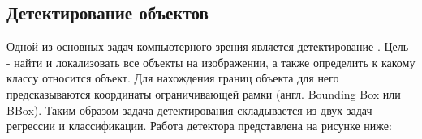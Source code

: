 \subsection{Детектирование объектов}

Одной из основных задач компьютерного зрения является детектирование \cite{lib-detection-task}. Цель - найти и локализовать все объекты на изображении, а также определить к какому классу относится объект. Для нахождения границ объекта для него предсказываются координаты ограничивающей рамки (англ. Bounding Box или BBox). Таким образом задача детектирования складывается из двух задач -- регрессии и классификации. Работа детектора представлена на рисунке ниже:


